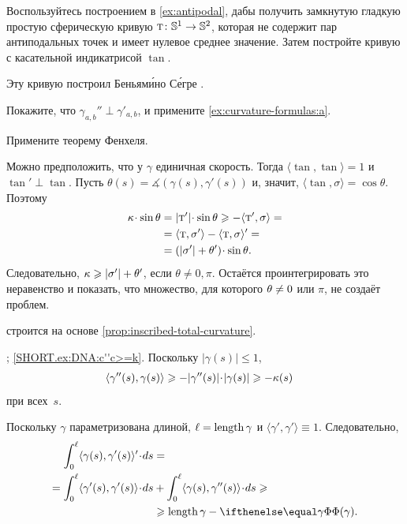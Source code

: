 \begin{multicols}{2}
Воспользуйтесь построением в \ref{ex:antipodal}, дабы получить замкнутую гладкую простую сферическую кривую $\tan\:\mathbb{S}^1\z\to\mathbb{S}^2$, которая не содержит пар антиподальных точек и имеет нулевое среднее значение.
Затем постройте кривую с касательной индикатрисой $\tan$.

Эту кривую построил Беньям\'{и}но С\'{е}гре \cite{segre}.

Покажите, что $\gamma_{a,b}''\perp \gamma'_{a,b}$, и примените \ref{ex:curvature-formulas:a}.

Примените теорему Фенхеля.

Можно предположить, что у $\gamma$ единичная скорость.
Тогда $\langle\tan,\tan\rangle=1$ и  $\tan'\perp \tan$.
Пусть $\theta(s)=\measuredangle(\gamma(s),\gamma'(s))$ и, значит, $\langle \tan,\sigma\rangle=\cos\theta$.
Поэтому
\begin{align*}
\kur\cdot \sin\theta
&=|\tan'|\cdot \sin\theta\ge
-\langle \tan',\sigma\rangle=
\\
&=
\langle \tan,\sigma'\rangle-\langle \tan,\sigma\rangle'=
\\
&=
(|\sigma'|+\theta')\cdot \sin\theta.
\end{align*}
Следовательно, $\kappa\geqslant |\sigma'|+\theta'$,
если $\theta\ne0,\pi$.
Остаётся проинтегрировать это неравенство и показать, что множество, для которого $\theta\z\ne0$ или $\pi$, не создаёт проблем.

 строится на основе \ref{prop:inscribed-total-curvature}.

\parbf{\ref{ex:DNA}}; \ref{SHORT.ex:DNA:c''c>=k}.
Поскольку $|\gamma(s)|\le 1$, 
\begin{align*}
\langle\gamma''(s),\gamma(s)\rangle&\ge -|\gamma''(s)|\cdot|\gamma(s)|\ge-\kur(s)
\end{align*}
при всех~$s$.

Поскольку $\gamma$ параметризована длиной, $\ell\z=\length\gamma$ и $\langle\gamma',\gamma'\rangle\equiv1$.
Следовательно,
\begin{align*}
\int_0^\ell\langle\gamma(s),\gamma'(s)\rangle'\cdot ds&=\\
=\int_0^\ell\langle\gamma'(s),\gamma'(s)\rangle\cdot ds&+\int_0^\ell\langle\gamma(s),\gamma''(s)\rangle\cdot ds\ge
\\
&\ge \length\gamma-\tc\gamma.
\end{align*}


\end{multicols}
